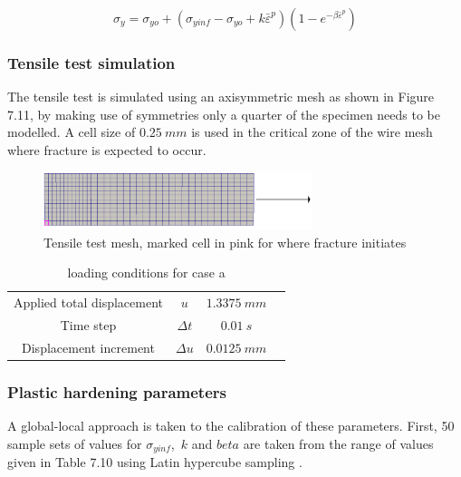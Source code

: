 \documentclass[sn-mathphys,Numbered,draft]{sn-jnl}%
\begin{document}
\begin{equation}
\label{eqn:modifiedVoce}
    \sigma_y=\sigma_{yo}+(\sigma_{yinf}-\sigma_{yo}+k\bar{\varepsilon}^p)(1-e^{-\beta\bar{\varepsilon}^p})
\end{equation}

\subsubsection{Tensile test simulation}

The tensile test is simulated using an axisymmetric mesh as shown in Figure 7.11, by making use of symmetries only a quarter of the specimen needs to be modelled. A cell size of $0.25\ mm$ is used in the critical zone of the wire mesh where fracture is expected to occur.

\begin{figure}[htb]
\begin{center}
	\includegraphics[width=0.7\textwidth]{./Figures/SimulationAndAnalysis/compareExperimentalSimulation/simTensileTest.png}
\caption{Tensile test mesh, marked cell in pink for where fracture initiates}
\label{fig:notchedRoundBAr}
\end{center}
\end{figure}

\begin{table}[htb]
	\centering
		\begin{tabular}{cccc} \hline
		    Applied total displacement & $u$ & $1.3375\ mm$ \\
		    Time step & $\Delta t$ & $0.01\ s$ \\
			Displacement increment  & $\Delta u$ & $0.0125\ mm$   \\
			\hline
		\end{tabular}
	\caption{loading conditions for case a}
	\label{tab:material_properties}
\end{table}

\subsubsection{Plastic hardening parameters}

A global-local approach is taken to the calibration of these parameters. First, 50 sample sets of values for $\sigma_{yinf}$,\ $k$ and $beta$ are taken from the range of values given in Table 7.10 using Latin hypercube sampling \cite{loh_latin_1996}. 
\end{document}
